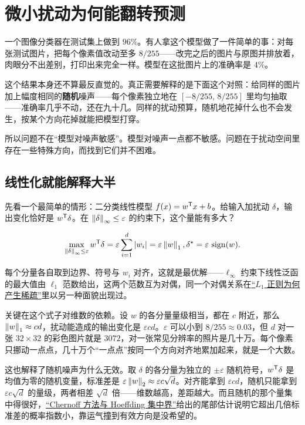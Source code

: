 \section{微小扰动为何能翻转预测}
\label{sec:17-Constrained-Guarantees/02-Adversarial-Robustness/01}

一个图像分类器在测试集上做到 \(96\%\)。有人拿这个模型做了一件简单的事：对每张测试图片，把每个像素值改动至多 \(8/255\)——改完之后的图片与原图并排放着，肉眼分不出差别，打印出来完全一样。模型在这批图片上的准确率是 \(4\%\)。

这个结果本身还不算最反直觉的。真正需要解释的是下面这个对照：给同样的图片加上幅度相同的\textbf{随机}噪声——每个像素独立地在 \([-8/255,\,8/255]\) 里均匀抽取——准确率几乎不动，还在九十几。同样的扰动预算，随机地花掉什么也不会发生，按某个方向花掉就能把模型打穿。

所以问题不在``模型对噪声敏感''。模型对噪声一点都不敏感。问题在于扰动空间里存在一些特殊方向，而找到它们并不困难。

\subsection{线性化就能解释大半}

先看一个最简单的情形：二分类线性模型 \(f(x)=w^{\mathsf{T}}x+b\)。给输入加扰动 \(\delta\)，输出变化恰好是 \(w^{\mathsf{T}}\delta\)。在 \(\left\lVert\delta\right\rVert_\infty\le\varepsilon\) 的约束下，这个量能有多大？

\[
\max_{\left\lVert\delta\right\rVert_\infty\le\varepsilon} w^{\mathsf{T}}\delta
=\varepsilon\sum_{i=1}^{d}\left|w_i\right|
=\varepsilon\left\lVert w\right\rVert_1,
\space
\delta^\star=\varepsilon\,\operatorname{sign}(w).
\]

每个分量各自取到边界、符号与 \(w_i\) 对齐，这就是最优解——\(\ell_\infty\) 约束下线性泛函的最大值由 \(\ell_1\) 范数给出，这两个范数互为对偶，同一个对偶关系在\hyperref[sec:09-Convex-Optimization/07-Applications/02]{``\(L_1\) 正则为何产生稀疏''}里以另一种面貌出现过。

关键在这个式子对维数的依赖。设 \(w\) 的各分量量级相当，都在 \(c\) 附近，那么 \(\left\lVert w\right\rVert_1\approx cd\)，扰动能造成的输出变化是 \(\varepsilon c d\)。\(\varepsilon\) 可以小到 \(8/255\approx0.03\)，但 \(d\) 对一张 \(32\times32\) 的彩色图片就是 \(3072\)，对一张常见分辨率的照片是几十万。每个像素只挪动一点点，几十万个``一点点''按同一个方向对齐地累加起来，就是一个大数。

这也解释了随机噪声为什么无效。取 \(\delta\) 的各分量为独立的 \(\pm\varepsilon\) 随机符号，\(w^{\mathsf{T}}\delta\) 是均值为零的随机变量，标准差是 \(\varepsilon\left\lVert w\right\rVert_2\approx\varepsilon c\sqrt d\)。对齐能拿到 \(\varepsilon c d\)，随机只能拿到 \(\varepsilon c\sqrt d\) 的量级，两者相差 \(\sqrt d\) 倍——维数越高，差距越大。而且随机的那个量集中得很好，\hyperref[sec:05-Probability/07-Transforms-and-Bounds/04]{``Chernoff 方法与 Hoeffding 集中界''}给出的尾部估计说明它超出几倍标准差的概率指数小，靠运气撞到有效方向是没希望的。

